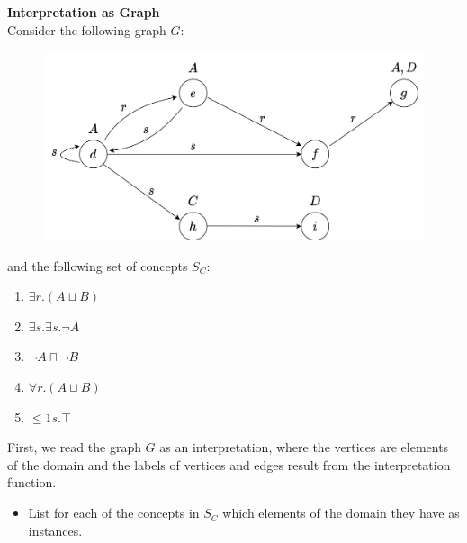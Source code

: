 \documentclass[12pt,a4paper]{article}
\newenvironment{problem}[2][{\color{red}Question}]{\begin{trivlist}
\item[\hskip \labelsep {\bfseries #1}\hskip \labelsep {\bfseries #2.}]}{\end{trivlist}}
\begin{document}
\begin{problem}{{\color{red}4}}
\textbf{Interpretation as Graph}\\
Consider the following graph $G$:
{\begin{figure}[ht]
    \centering
    \includegraphics[width=0.55\columnwidth]{graph-min.jpg}
\end{figure}}
and the following set of concepts $S_{C}$:
\begin{enumerate}
    \item $\exists r.(A\sqcup B)$
    \item $\exists s.\exists s.\neg A$
    \item $\neg A\sqcap\neg B$
    \item $\forall r.(A\sqcup B)$
    \item $\leq{1}{s}.\top$
\end{enumerate}
First, we read the graph $G$ as an interpretation, where the vertices are elements of the domain and the labels of vertices and edges result from the interpretation function.
\begin{itemize}
    \item List for each of the concepts in $S_{C}$ which elements of the domain they have as instances.
\end{itemize}
\end{problem}
\end{document}
